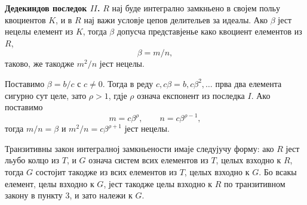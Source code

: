 ﻿\documentclass[11pt]{article}
\begin{document}
\medskip
\noindent\textbf{Дедекиндов последок $II$.} $R$ нај буде интегрално замкньено в својем польу квоциентов $K$, и в $R$ нај важи условје цепов делительев за идеалы. Ако $\beta$ јест нецелы елемент из $K$, тогда $\beta$ допусча представјенье како квоциент елементов из $R$,
\[
        \beta=m/n,
\]
таково, же такодже $m^2/n$ јест нецелы.

Поставимо $\beta=b/c$ с $c\ne0$. Тогда в реду $c,c\beta=b,c\beta^2,\ldots$ прва два елемента сигурно сут целе, зато $\rho>1$, гдје $\rho$ означа експонент из последка $I$. Ако поставимо
\[
        m=c\beta^\rho,\qquad n=c\beta^{\rho-1},
\]
тогда $m/n=\beta$ и $m^2/n=c\beta^{\rho+1}$ јест нецелы.

Транзитивны закон интегралној замкньености имаје следујучу форму: ако $R$ јест льубо колцо из $T$, и $G$ означа систем всих елементов из $T$, целых взходно к $R$, тогда $G$ состојит такодже из всих елементов из $T$, целых взходно к $G$. Бо всакы елемент, целы взходно к $G$, јест такодже целы взходно к $R$ по транзитивном закону в пункту 3, и зато належи к $G$.
\end{document}
